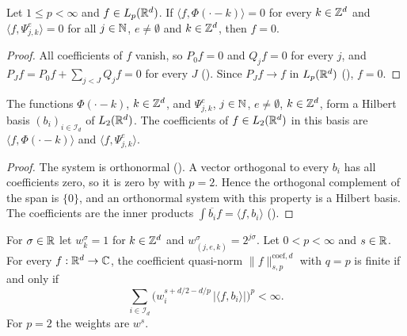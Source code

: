 \begin{lemma}
\label{lem:daub-rd-coeff-uniqueness}
\leanok
{}
Let $1 \leq p < \infty$ and $f \in L_p(\mathbb{R}^d)$. If $\langle f, \Phi(\cdot - k) \rangle = 0$ for
every $k \in \mathbb{Z}^d$ and $\langle f, \Psi^e_{j,k} \rangle = 0$ for all $j \in \mathbb{N}$,
$e \neq \emptyset$ and $k \in \mathbb{Z}^d$, then $f = 0$.
\end{lemma}

\begin{proof}
\leanok
{}
All coefficients of $f$ vanish, so $P_0 f = 0$ and $Q_j f = 0$ for every $j$, and
$P_J f = P_0 f + \sum_{j < J} Q_j f = 0$ for every $J$ (). Since
$P_J f \to f$ in $L_p(\mathbb{R}^d)$ (), $f = 0$.
\end{proof}

\begin{theorem}
\label{thm:daub-rd-hilbert-basis}
\leanok
{}
The functions $\Phi(\cdot - k)$, $k \in \mathbb{Z}^d$, and $\Psi^e_{j,k}$, $j \in \mathbb{N}$,
$e \neq \emptyset$, $k \in \mathbb{Z}^d$, form a Hilbert basis $(b_i)_{i \in \mathcal{I}_d}$ of
$L_2(\mathbb{R}^d)$. The coefficients of $f \in L_2(\mathbb{R}^d)$ in this basis are
$\langle f, \Phi(\cdot - k) \rangle$ and $\langle f, \Psi^e_{j,k} \rangle$.
\end{theorem}

\begin{proof}
\leanok
{}
The system is orthonormal (). A vector orthogonal to every
$b_i$ has all coefficients zero, so it is zero by  with
$p = 2$. Hence the orthogonal complement of the span is $\{0\}$, and an orthonormal system with
this property is a Hilbert basis. The coefficients are the inner products
$\int \overline{b_i} f = \langle f, b_i \rangle$ ().
\end{proof}

\begin{lemma}
\label{lem:daub-rd-coeff-sums}
\leanok
{}
For $\sigma \in \mathbb{R}$ let $w^\sigma_k = 1$ for $k \in \mathbb{Z}^d$ and $w^\sigma_{(j,e,k)} = 2^{j\sigma}$.
Let $0 < p < \infty$ and $s \in \mathbb{R}$. For every $f : \mathbb{R}^d \to \mathbb{C}$, the coefficient quasi-norm
$\|f\|^{\mathrm{coef},d}_{s,p}$ with $q = p$ is finite if and only if
\[
  \sum_{i \in \mathcal{I}_d} \bigl(w^{s + d/2 - d/p}_i \, |\langle f, b_i \rangle|\bigr)^p
  < \infty .
\]
For $p = 2$ the weights are $w^s$.
\end{lemma}

